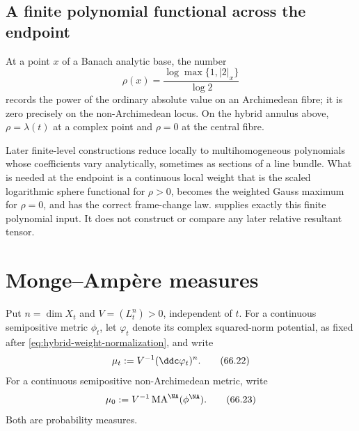\subsection{A finite polynomial functional across the endpoint}
\label{sec:hybrid-polynomial-functional}

At a point $x$ of a Banach analytic base, the number
\[
             \rho(x)=\frac{\log\max\{1,|2|_x\}}{\log 2}
\]
records the power of the ordinary absolute value on an Archimedean fibre;
it is zero precisely on the non-Archimedean locus.  On the hybrid annulus
above, $\rho=\lambda(t)$ at a complex point and $\rho=0$ at the central
fibre.

Later finite-level constructions reduce locally to multihomogeneous
polynomials whose coefficients vary analytically, sometimes as sections of
a line bundle.  What is needed at the endpoint is a continuous local weight
that is the scaled logarithmic sphere functional for $\rho>0$, becomes the
weighted Gauss maximum for $\rho=0$, and has the correct frame-change law.
 supplies exactly this finite
polynomial input.  It does not construct or compare any later relative
resultant tensor.

\begingroup
\edef\savedWeightedPGEquation{\number\value{equation}}
\renewcommand{\theequation}{66.W\arabic{equation}}
\renewcommand{\theHequation}{66.W.\arabic{equation}}
\setcounter{equation}{0}


\setcounter{equation}{\savedWeightedPGEquation}
\endgroup

\section{Monge--Amp\`ere measures}
\label{sec:hybrid-ma}

Put $n=\dim X_t$ and $V=(L_t^n)>0$, independent of $t$.
For a continuous semipositive metric $\phi_t$, let $\varphi_t$ denote
its complex squared-norm potential, as fixed after
\eqref{eq:hybrid-weight-normalization}, and write
\[
          \mu_t:=V^{-1}(\ddc\varphi_t)^n.
\tag{66.22}\label{eq:hybrid-complex-ma}
\]
For a continuous semipositive non-Archimedean metric, write
\[
          \mu_0:=V^{-1}\operatorname{MA}^{\NA}(\phi^{\NA}).
\tag{66.23}\label{eq:hybrid-na-ma}
\]
Both are probability measures.

